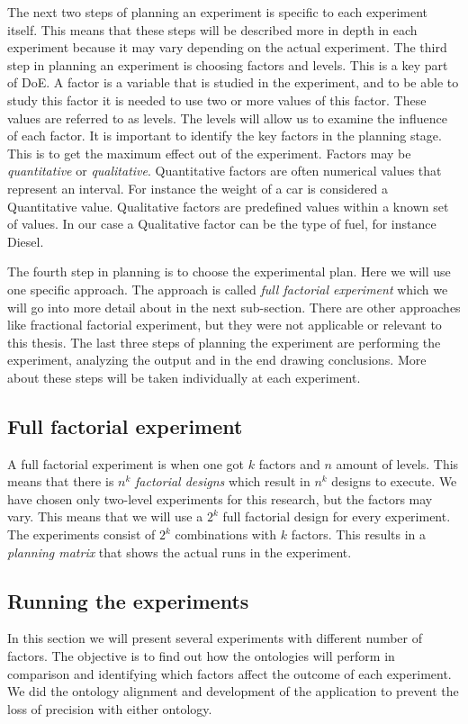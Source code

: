 \documentclass{llncs}
\begin{document}
The next two steps of planning an experiment is specific to each
experiment itself. This means that these steps will be described more
in depth in each experiment because it may vary depending on the
actual experiment.  The third step in planning an experiment is
choosing factors and levels. This is a key part of DoE. A factor is a
variable that is studied in the experiment, and to be able to study
this factor it is needed to use two or more values of this
factor. These values are referred to as levels.  The levels will allow
us to examine the influence of each factor. It is important to
identify the key factors in the planning stage. This is to get the
maximum effect out of the experiment.  Factors may be
\emph{quantitative} or \emph{qualitative}. Quantitative factors
are often numerical values that represent an interval. For instance
the weight of a car is considered a Quantitative value. Qualitative
factors are predefined values within a known set of values.  In our
case a Qualitative factor can be the type of fuel, for instance
Diesel.

The fourth step in planning is to choose the experimental plan. Here
we will use one specific approach. The approach is called \emph{full
  factorial experiment} which we will go into more detail about in the
next sub-section. There are other approaches like fractional factorial
experiment, but they were not applicable or relevant to this thesis.
The last three steps of planning the experiment are performing the
experiment, analyzing the output and in the end drawing
conclusions. More about these steps will be taken individually at each
experiment. 


\subsection{Full factorial experiment}
A full factorial experiment is when one got $k$ factors and $n$ amount
of levels. This means that there is $n^k$ \emph{factorial designs}
which result in $n^k$ designs to execute.  We have chosen only
two-level experiments for this research, but the factors may
vary. This means that we will use a $2^k$ full factorial design for
every experiment. The experiments consist of $2^k$ combinations with
$k$ factors. This results in a \emph{planning matrix} that shows the
actual runs in the experiment.




\subsection{Running the experiments}
In this section we will present several experiments with different
number of factors.  The objective is to find out how the ontologies
will perform in comparison and identifying which factors affect the
outcome of each experiment. We did the ontology alignment and
development of the application to prevent the loss of precision with
either ontology.
\end{document}
